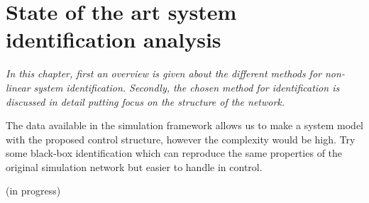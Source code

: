 \chapter{State of the art system identification analysis}
\label{identification_methods}

\emph{In this chapter, first an overview is given about the different methods for non-linear system identification. Secondly, the chosen method for identification is discussed in detail putting focus on the structure of the network.}

The data available in the simulation framework allows us to make a system model with the proposed control structure, however the complexity would be high. Try some black-box identification which can reproduce the same properties of the original simulation network but easier to handle in control. 

(in progress)